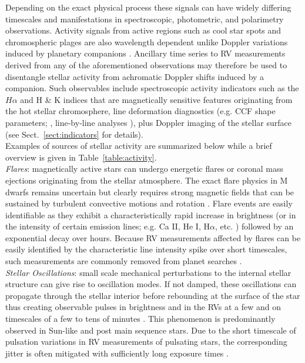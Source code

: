 Depending on the exact physical process these
signals can have widely differing timescales and manifestations in
spectroscopic, photometric, and polarimetry observations. Activity
signals from active regions such as cool star spots and chromospheric plages 
are also wavelength dependent unlike Doppler variations induced by
planetary companions \citep{tal-or18}. Ancillary time series to RV measurements
derived from any of the aforementioned observations may therefore be used to
disentangle stellar activity from achromatic Doppler shifts induced by a companion.
Such observables include spectroscopic activity indicators such as the $H\alpha$ and
\caii{} H \& K indices that are magnetically sensitive features originating from the hot stellar
chromosphere, line deformation diagnostics (e.g. CCF shape parameters; \citealt{boisse11},
line-by-line analyses \citealt{davis17,dumusque18}), plus Doppler imaging of the stellar surface
\citep{hebrard16} (see Sect.~\ref{sect:indicators} for details). \\

Examples of sources of stellar activity are summarized below
while a brief overview is given in Table~\ref{table:activity}. \\



\emph{Flares}: magnetically active stars can undergo energetic flares or coronal mass
ejections originating from the stellar atmosphere. The exact flare physics
in M dwarfs remains uncertain but clearly requires strong magnetic fields
that can be sustained by turbulent convective motions and rotation
\citep{browning08}. Flare events are easily identifiable as they
exhibit a characteristically rapid increase in brightness (or in the intensity
of certain emission lines; e.g. Ca II, He I, H$\alpha$, etc. \citealt{schmidt12})
followed by an exponential decay over hours. Because RV
measurements affected by flares can be easily identified by the characteristic
line intensity spike over short timescales, such measurements are commonly
removed from planet searches \citep{reiners09}. \\

\emph{Stellar Oscillations}:
small scale mechanical perturbations to the internal stellar structure
can give rise to oscillation modes. If not damped, these oscillations
can propagate through the stellar interior before rebounding at the surface
of the star thus creating observable pulses in brightness and in the RVs at a
few \mps{} and on timescales of a few to tens of minutes \citep{bedding01}. 
This phenomenon is predominantly observed in Sun-like and post main sequence stars.
Due to the short timescale of
pulsation variations in RV measurements of pulsating stars, the corresponding
jitter is often mitigated with sufficiently long exposure times
\citep{lovis05, dumusque11a}. \\



